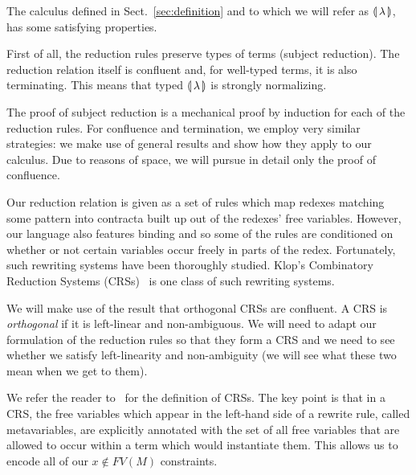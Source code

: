 \documentclass{llncs}
\begin{document}
The calculus defined in Sect.~\ref{sec:definition} and to which we will
refer as $\llparenthesis \, \lambda \, \rrparenthesis$, has some satisfying properties.

First of all, the reduction rules preserve types of terms (subject
reduction). The reduction relation itself is confluent and, for well-typed
terms, it is also terminating. This means that typed $\llparenthesis \, \lambda \, \rrparenthesis$ is
strongly normalizing.

The proof of subject reduction is a mechanical proof by induction for each
of the reduction rules. For confluence and termination, we employ very
similar strategies: we make use of general results and show how they apply
to our calculus. Due to reasons of space, we will pursue in detail only the
proof of confluence.

Our reduction relation is given as a set of rules which map redexes
matching some pattern into contracta built up out of the redexes' free
variables. However, our language also features binding and so some of the
rules are conditioned on whether or not certain variables occur freely in
parts of the redex. Fortunately, such rewriting systems have been
thoroughly studied. Klop's Combinatory Reduction Systems
(CRSs)~\cite{klop1993combinatory} is one class of such rewriting systems.

We will make use of the result that orthogonal CRSs are confluent. A CRS is
\emph{orthogonal} if it is left-linear and non-ambiguous. We will need to
adapt our formulation of the reduction rules so that they form a CRS and we
need to see whether we satisfy left-linearity and non-ambiguity (we will
see what these two mean when we get to them).

We refer the reader to~\cite{klop1993combinatory} for the definition of
CRSs. The key point is that in a CRS, the free variables which appear in
the left-hand side of a rewrite rule, called metavariables, are explicitly
annotated with the set of all free variables that are allowed to occur
within a term which would instantiate them. This allows us to encode all of
our $x \notin FV(M)$ constraints.
\end{document}
